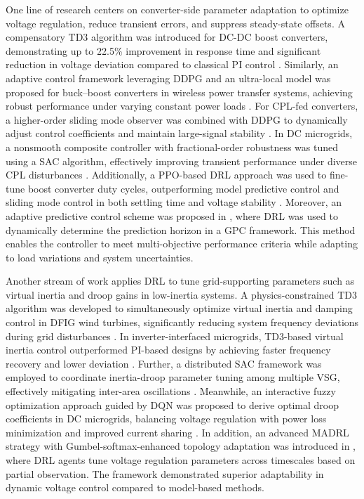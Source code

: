 One line of research centers on converter-side parameter adaptation to optimize voltage regulation, reduce transient errors, and suppress steady-state offsets. A compensatory TD3 algorithm was introduced for DC-DC boost converters, demonstrating up to 22.5\% improvement in response time and significant reduction in voltage deviation compared to classical PI control \cite{cheng2025novel}. Similarly, an adaptive control framework leveraging DDPG and an ultra-local model was proposed for buck–boost converters in wireless power transfer systems, achieving robust performance under varying constant power loads \cite{gheisarnejad2020novel}. For CPL-fed converters, a higher-order sliding mode observer was combined with DDPG to dynamically adjust control coefficients and maintain large-signal stability \cite{huangfu2022learning}. In DC microgrids, a nonsmooth composite controller with fractional-order robustness was tuned using a SAC algorithm, effectively improving transient performance under diverse CPL disturbances \cite{zhou2023drl}. Additionally, a PPO-based DRL approach was used to fine-tune boost converter duty cycles, outperforming model predictive control and sliding mode control in both settling time and voltage stability \cite{saha2024proximal}. Moreover, an adaptive predictive control scheme was proposed in \cite{cui2023adaptive}, where DRL was used to dynamically determine the prediction horizon in a GPC framework. This method enables the controller to meet multi-objective performance criteria while adapting to load variations and system uncertainties.

Another stream of work applies DRL to tune grid-supporting parameters such as virtual inertia and droop gains in low-inertia systems. A physics-constrained TD3 algorithm was developed to simultaneously optimize virtual inertia and damping control in DFIG wind turbines, significantly reducing system frequency deviations during grid disturbances \cite{egbomwan2024physics}. In inverter-interfaced microgrids, TD3-based virtual inertia control outperformed PI-based designs by achieving faster frequency recovery and lower deviation \cite{egbomwan2022twin}. Further, a distributed SAC framework was employed to coordinate inertia-droop parameter tuning among multiple VSG, effectively mitigating inter-area oscillations \cite{yang2022distributed}. Meanwhile, an interactive fuzzy optimization approach guided by DQN was proposed to derive optimal droop coefficients in DC microgrids, balancing voltage regulation with power loss minimization and improved current sharing \cite{thanh2022improving}. In addition, an advanced MADRL strategy with Gumbel-softmax-enhanced topology adaptation was introduced in \cite{wu2023multi}, where DRL agents tune voltage regulation parameters across timescales based on partial observation. The framework demonstrated superior adaptability in dynamic voltage control compared to model-based methods.

